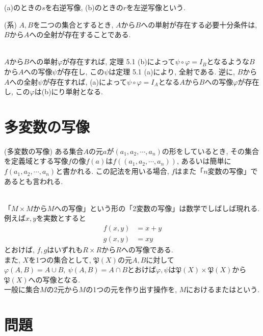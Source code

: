 \documentclass[a4j]{jsarticle}
\begin{document}
 (a)のときの$s$を右逆写像, (b)のときの$r$を左逆写像という. \\

\begin{itembox}[l]{ (系)}
  $A,B$を二つの集合とするとき, $A$から$B$への単射が存在する必要十分条件は, $B$から$A$への全射が存在することである.
\end{itembox}\\

 $A$から$B$への単射$\varphi$が存在すれば, 定理 5.1 (b)によって$\psi \circ \varphi = I_B$となるような$B$から$A$への写像$\psi$が存在し, この$\psi$は定理 5.1 (a)により, 全射である. 逆に, $B$から$A$への全射$\psi$が存在すれば, (a)によって$\psi \circ \varphi = I_A$となる$A$から$B$への写像$\varphi$が存在し, この$\varphi$は(b)にり単射となる.

\section{多変数の写像}

\begin{itembox}[l]{ (多変数の写像)}
  ある集合$A$の元$a$が$(a_1,a_2,\cdots,a_n)$の形をしているとき, その集合を定義域とする写像$f$の像$f(a)$は$f((a_1,a_2,\cdots,a_n))$, あるいは簡単に$f(a_1,a_2,\cdots,a_n)$と書かれる. この記法を用いる場合, $f$はまた「$n$変数の写像」であるとも言われる.
\end{itembox}\\

 「$M \times M$から$M$への写像」という形の「2変数の写像」は数学でしばしば現れる. \\
例えば$x,y$を実数とすると
\begin{align}
  f(x,y) & = x + y \\
  g(x,y) & = xy
\end{align}
とおけば, $f,g$はいずれも$R \times R$から$R$への写像である. \\

また, $X$を1つの集合として, $\mathfrak{P}(X)$の元$A,B$に対して$\varphi(A,B) = A \cup B,\:\psi(A,B) = A \cap B$とおけば$\varphi,\psi$は$\mathfrak{P}(X) \times \mathfrak{P}(X)$から$\mathfrak{P}(X)$への写像となる. \\

一般に集合$M$の2元から$M$の1つの元を作り出す操作を, $M$におけるまたはという.

\section{問題}
\end{document}

